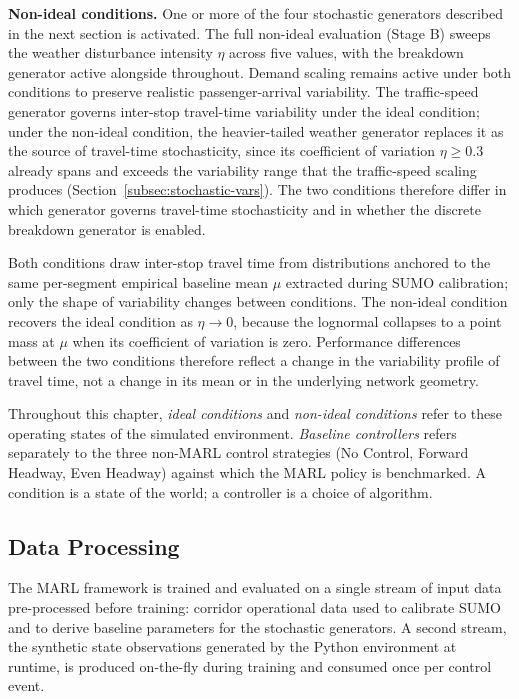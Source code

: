 \textbf{Non-ideal conditions.} One or more of the four stochastic generators described in the next section is activated. The full non-ideal evaluation (Stage B) sweeps the weather disturbance intensity $\eta$ across five values, with the breakdown generator active alongside throughout. Demand scaling remains active under both conditions to preserve realistic passenger-arrival variability. The traffic-speed generator governs inter-stop travel-time variability under the ideal condition; under the non-ideal condition, the heavier-tailed weather generator replaces it as the source of travel-time stochasticity, since its coefficient of variation $\eta \geq 0.3$ already spans and exceeds the variability range that the traffic-speed scaling produces (Section~\ref{subsec:stochastic-vars}). The two conditions therefore differ in which generator governs travel-time stochasticity and in whether the discrete breakdown generator is enabled.

Both conditions draw inter-stop travel time from distributions anchored to the same per-segment empirical baseline mean $\mu$ extracted during SUMO calibration; only the shape of variability changes between conditions. The non-ideal condition recovers the ideal condition as $\eta \to 0$, because the lognormal collapses to a point mass at $\mu$ when its coefficient of variation is zero. Performance differences between the two conditions therefore reflect a change in the variability profile of travel time, not a change in its mean or in the underlying network geometry.

Throughout this chapter, \textit{ideal conditions} and \textit{non-ideal conditions} refer to these operating states of the simulated environment. \textit{Baseline controllers} refers separately to the three non-MARL control strategies (No Control, Forward Headway, Even Headway) against which the MARL policy is benchmarked. A condition is a state of the world; a controller is a choice of algorithm.

\subsection{Data Processing}

The MARL framework is trained and evaluated on a single stream of input data pre-processed before training: corridor operational data used to calibrate SUMO and to derive baseline parameters for the stochastic generators. A second stream, the synthetic state observations generated by the Python environment at runtime, is produced on-the-fly during training and consumed once per control event.

